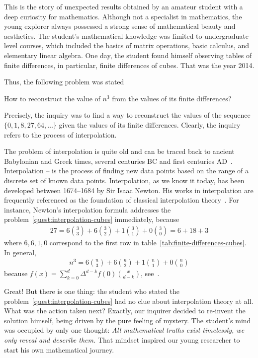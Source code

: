 This is the story of unexpected results obtained by an amateur
student with a deep curiosity for mathematics.
Although not a specialist in mathematics,
the young explorer always possessed a strong sense of mathematical beauty and aesthetics.
The student's mathematical knowledge was limited to undergraduate-level courses, which included the basics of
matrix operations, basic calculus, and elementary linear algebra.
One day, the student found himself observing tables of finite differences,
in particular, finite differences of cubes.
That was the year 2014.


Thus, the following problem was stated
\begin{problem}
    \label{quest:interpolation-cubes}
    How to reconstruct the value of $n^3$ from the values of its finite differences?
\end{problem}
Precisely, the inquiry was to find a way to reconstruct the values of the sequence $\{0, 1, 8, 27, 64, \ldots\}$
given the values of its finite differences.
Clearly, the inquiry refers to the process of interpolation.

The problem of interpolation is quite old and can be traced back
to ancient Babylonian and Greek times, several centuries BC and first centuries AD~\cite{gautschi2012interpolation}.
Interpolation -- is the process of finding new data points based on the range of a discrete set
of known data points.
Interpolation, as we know it today, has been developed between 1674--1684 by Sir Isaac Newton.
His works in interpolation are frequently referenced as
the foundation of classical interpolation theory~\cite{meijering2002chronology}.
For instance, Newton's interpolation formula addresses the problem~\eqref{quest:interpolation-cubes} immediately,
because
\begin{align*}
    27 = 6 \binom{3}{3} + 6 \binom{3}{2} + 1 \binom{3}{1} + 0\binom{3}{0} = 6 + 18 + 3
\end{align*}
where $6,6,1,0$ correspond to the first row in table~\eqref{tab:finite-differences-cubes}.
In general,
\begin{align*}
    n^3 = 6 \binom{n}{3} + 6 \binom{n}{2} + 1\binom{n}{1} + 0 \binom{n}{0}
\end{align*}
because $f(x) = \sum_{k=0}^{d} \Delta^{d-k} f(0) \binom{x}{d-k}$, see~\cite[~p. 190]{graham1994concrete}.

Great!
But there is one thing: the student who stated the problem~\eqref{quest:interpolation-cubes}
had no clue about interpolation theory at all.
What was the action taken next?
Exactly, our inquirer decided to re-invent the solution himself, being driven by the pure feeling of mystery.
The student's mind was occupied by only one thought:
\textit{All mathematical truths exist timelessly, we only reveal and describe them.}
That mindset inspired our young researcher to start his own mathematical journey.

